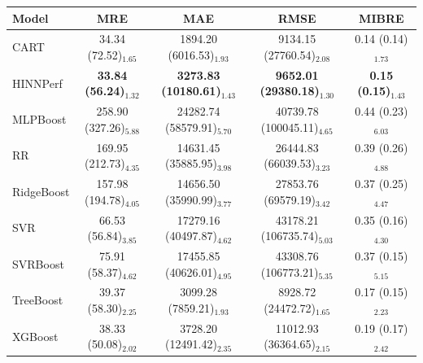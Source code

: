 \begin{tabular}{lcccc}
\toprule
Model & MRE & MAE & RMSE & MIBRE \\
\midrule
CART & 34.34 (72.52)$_{1.65}$ & 1894.20 (6016.53)$_{1.93}$ & 9134.15 (27760.54)$_{2.08}$ & 0.14 (0.14)$_{1.73}$ \\
HINNPerf & \textbf{33.84 (56.24)$_{1.32}$} & \textbf{3273.83 (10180.61)$_{1.43}$} & \textbf{9652.01 (29380.18)$_{1.30}$} & \textbf{0.15 (0.15)$_{1.43}$} \\
MLPBoost & 258.90 (327.26)$_{5.88}$ & 24282.74 (58579.91)$_{5.70}$ & 40739.78 (100045.11)$_{4.65}$ & 0.44 (0.23)$_{6.03}$ \\
RR & 169.95 (212.73)$_{4.35}$ & 14631.45 (35885.95)$_{3.98}$ & 26444.83 (66039.53)$_{3.23}$ & 0.39 (0.26)$_{4.88}$ \\
RidgeBoost & 157.98 (194.78)$_{4.05}$ & 14656.50 (35990.99)$_{3.77}$ & 27853.76 (69579.19)$_{3.42}$ & 0.37 (0.25)$_{4.47}$ \\
SVR & 66.53 (56.84)$_{3.85}$ & 17279.16 (40497.87)$_{4.62}$ & 43178.21 (106735.74)$_{5.03}$ & 0.35 (0.16)$_{4.30}$ \\
SVRBoost & 75.91 (58.37)$_{4.62}$ & 17455.85 (40626.01)$_{4.95}$ & 43308.76 (106773.21)$_{5.35}$ & 0.37 (0.15)$_{5.15}$ \\
TreeBoost & 39.37 (58.30)$_{2.25}$ & 3099.28 (7859.21)$_{1.93}$ & 8928.72 (24472.72)$_{1.65}$ & 0.17 (0.15)$_{2.23}$ \\
XGBoost & 38.33 (50.08)$_{2.02}$ & 3728.20 (12491.42)$_{2.35}$ & 11012.93 (36364.65)$_{2.15}$ & 0.19 (0.17)$_{2.42}$ \\
\bottomrule
\end{tabular}
